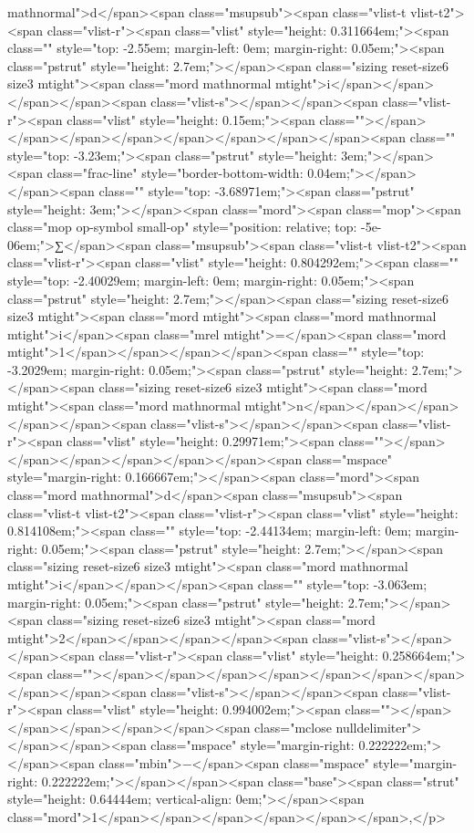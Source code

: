 mathnormal">d</span><span class="msupsub"><span class="vlist-t vlist-t2"><span class="vlist-r"><span class="vlist" style="height: 0.311664em;"><span class="" style="top: -2.55em; margin-left: 0em; margin-right: 0.05em;"><span class="pstrut" style="height: 2.7em;"></span><span class="sizing reset-size6 size3 mtight"><span class="mord mathnormal mtight">i</span></span></span></span><span class="vlist-s">​</span></span><span class="vlist-r"><span class="vlist" style="height: 0.15em;"><span class=""></span></span></span></span></span></span></span></span><span class="" style="top: -3.23em;"><span class="pstrut" style="height: 3em;"></span><span class="frac-line" style="border-bottom-width: 0.04em;"></span></span><span class="" style="top: -3.68971em;"><span class="pstrut" style="height: 3em;"></span><span class="mord"><span class="mop"><span class="mop op-symbol small-op" style="position: relative; top: -5e-06em;">∑</span><span class="msupsub"><span class="vlist-t vlist-t2"><span class="vlist-r"><span class="vlist" style="height: 0.804292em;"><span class="" style="top: -2.40029em; margin-left: 0em; margin-right: 0.05em;"><span class="pstrut" style="height: 2.7em;"></span><span class="sizing reset-size6 size3 mtight"><span class="mord mtight"><span class="mord mathnormal mtight">i</span><span class="mrel mtight">=</span><span class="mord mtight">1</span></span></span></span><span class="" style="top: -3.2029em; margin-right: 0.05em;"><span class="pstrut" style="height: 2.7em;"></span><span class="sizing reset-size6 size3 mtight"><span class="mord mtight"><span class="mord mathnormal mtight">n</span></span></span></span></span><span class="vlist-s">​</span></span><span class="vlist-r"><span class="vlist" style="height: 0.29971em;"><span class=""></span></span></span></span></span></span><span class="mspace" style="margin-right: 0.166667em;"></span><span class="mord"><span class="mord mathnormal">d</span><span class="msupsub"><span class="vlist-t vlist-t2"><span class="vlist-r"><span class="vlist" style="height: 0.814108em;"><span class="" style="top: -2.44134em; margin-left: 0em; margin-right: 0.05em;"><span class="pstrut" style="height: 2.7em;"></span><span class="sizing reset-size6 size3 mtight"><span class="mord mathnormal mtight">i</span></span></span><span class="" style="top: -3.063em; margin-right: 0.05em;"><span class="pstrut" style="height: 2.7em;"></span><span class="sizing reset-size6 size3 mtight"><span class="mord mtight">2</span></span></span></span><span class="vlist-s">​</span></span><span class="vlist-r"><span class="vlist" style="height: 0.258664em;"><span class=""></span></span></span></span></span></span></span></span></span><span class="vlist-s">​</span></span><span class="vlist-r"><span class="vlist" style="height: 0.994002em;"><span class=""></span></span></span></span></span><span class="mclose nulldelimiter"></span></span><span class="mspace" style="margin-right: 0.222222em;"></span><span class="mbin">−</span><span class="mspace" style="margin-right: 0.222222em;"></span></span><span class="base"><span class="strut" style="height: 0.64444em; vertical-align: 0em;"></span><span class="mord">1</span></span></span></span></span></span>,</p>

